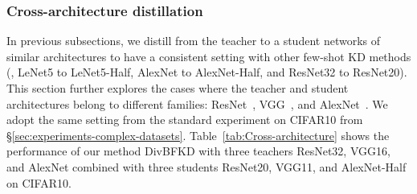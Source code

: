 \subsubsection{Cross-architecture distillation} \label{sec:experiments-crossarch}
\begin{foldable}
  In previous subsections, we distill from the teacher to a student networks of similar architectures to have a consistent setting with other few-shot \ac{KD} methods (\eg, LeNet5 to LeNet5-Half, AlexNet to AlexNet-Half, and ResNet32 to ResNet20).
  This section further explores the cases where the teacher and student architectures belong to different families: ResNet~\cite{he2016deep}, VGG~\cite{simonyan2014very}, and AlexNet~\cite{krizhevsky2012imagenet}.
  We adopt the same setting from the standard experiment on CIFAR10 from \S\ref{sec:experiments-complex-datasets}.
  Table~\ref{tab:Cross-architecture} shows the performance of our method DivBFKD with three teachers ResNet32, VGG16, and AlexNet combined with three students ResNet20, VGG11, and AlexNet-Half on CIFAR10.
\end{foldable}

